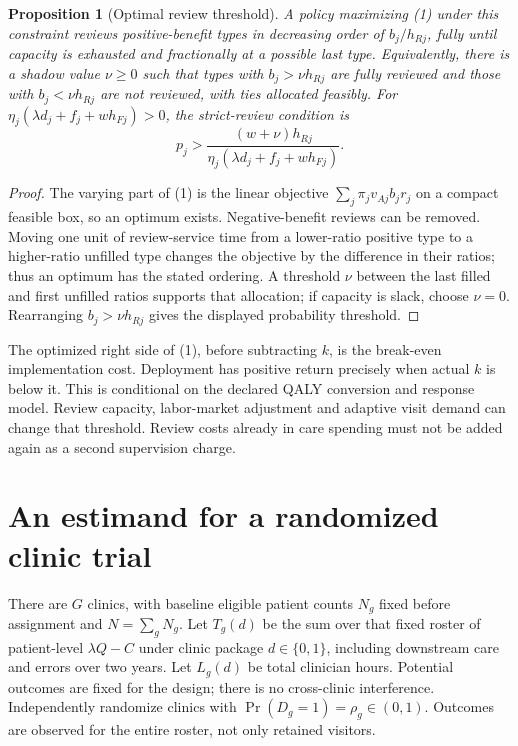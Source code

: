 \documentclass[11pt,a4paper]{article}
\newtheorem{proposition}[theorem]{Proposition}
\theoremstyle{definition}
\theoremstyle{remark}
\begin{document}
\begin{proposition}[Optimal review threshold]
A policy maximizing (1) under this constraint reviews positive-benefit types in decreasing order of $b_j/h_{Rj}$, fully until capacity is exhausted and fractionally at a possible last type. Equivalently, there is a shadow value $\nu\geq0$ such that types with $b_j>\nu h_{Rj}$ are fully reviewed and those with $b_j<\nu h_{Rj}$ are not reviewed, with ties allocated feasibly. For $\eta_j(\lambda d_j+f_j+wh_{Fj})>0$, the strict-review condition is
\[
 p_j>\frac{(w+\nu)h_{Rj}}{\eta_j(\lambda d_j+f_j+wh_{Fj})}.
\]
\end{proposition}
\begin{proof}
The varying part of (1) is the linear objective $\sum_j\pi_jv_{Aj}b_jr_j$ on a compact feasible box, so an optimum exists. Negative-benefit reviews can be removed. Moving one unit of review-service time from a lower-ratio positive type to a higher-ratio unfilled type changes the objective by the difference in their ratios; thus an optimum has the stated ordering. A threshold $\nu$ between the last filled and first unfilled ratios supports that allocation; if capacity is slack, choose $\nu=0$. Rearranging $b_j>\nu h_{Rj}$ gives the displayed probability threshold.
\end{proof}

The optimized right side of (1), before subtracting $k$, is the break-even implementation cost. Deployment has positive return precisely when actual $k$ is below it. This is conditional on the declared QALY conversion and response model. Review capacity, labor-market adjustment and adaptive visit demand can change that threshold. Review costs already in care spending must not be added again as a second supervision charge.

\section{An estimand for a randomized clinic trial}
There are $G$ clinics, with baseline eligible patient counts $N_g$ fixed before assignment and $N=\sum_gN_g$. Let $T_g(d)$ be the sum over that fixed roster of patient-level $\lambda Q-C$ under clinic package $d\in\{0,1\}$, including downstream care and errors over two years. Let $L_g(d)$ be total clinician hours. Potential outcomes are fixed for the design; there is no cross-clinic interference. Independently randomize clinics with $\Pr(D_g=1)=\rho_g\in(0,1)$. Outcomes are observed for the entire roster, not only retained visitors.
\end{document}
